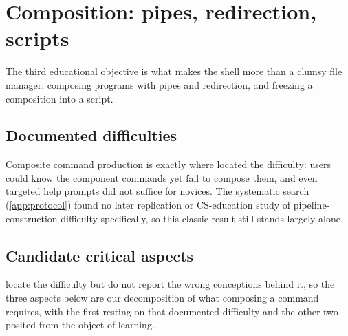\mode*
\section{Composition: pipes, redirection, scripts}
\label{sec:composition}

The third educational objective is what makes the shell more than a clumsy
file manager: composing programs with pipes and redirection, and freezing a
composition into a script.

\subsection{Documented difficulties}

Composite command production is exactly where
\textcite{Doane1992UnixPrompts} located the difficulty: users could know
the component commands yet fail to compose them, and even targeted help
prompts did not suffice for novices.
The systematic search (\cref{app:protocol}) found no later replication or
CS-education study of pipeline-construction difficulty specifically, so this
classic result still stands largely alone.

\subsection{Candidate critical aspects}
\label{sec:composition-aspects}

\Textcite{Doane1992UnixPrompts} locate the difficulty but do not report
the wrong conceptions behind it, so the three aspects below are our
decomposition of what composing a command requires, with the first
resting on that documented difficulty and the other two posited from the
object of learning.

